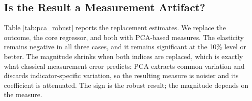 \documentclass[economies,article,submit,moreauthors]{Definitions/mdpi}
\begin{document}
\subsection{Is the Result a Measurement Artifact?}

Table \ref{tab:pca_robust} reports the replacement estimates. We replace the outcome, the core regressor, and both with PCA-based measures. The elasticity remains negative in all three cases, and it remains significant at the 10\% level or better. The magnitude shrinks when both indices are replaced, which is exactly what classical measurement error predicts: PCA extracts common variation and discards indicator-specific variation, so the resulting measure is noisier and its coefficient is attenuated. The sign is the robust result; the magnitude depends on the measure.
\end{document}
